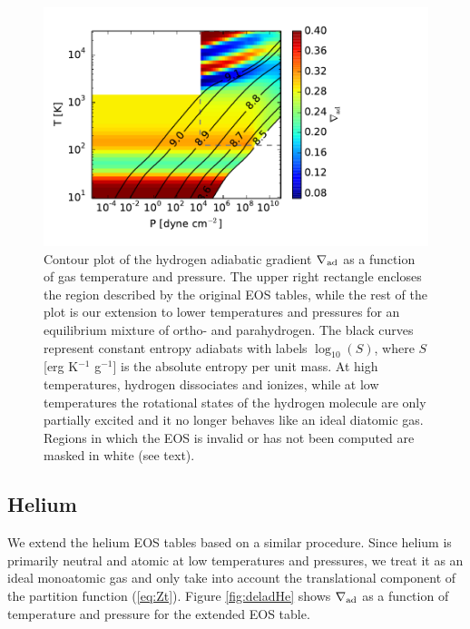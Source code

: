 \begin{figure}[h!]
\centering
\includegraphics[scale=.8]{figures/delad_S_H.pdf}
\caption{Contour plot of the hydrogen adiabatic gradient $\nabla_{\rm ad}$ as a function of gas temperature and pressure. The upper right rectangle encloses the region described by the original \citet{saumon95} EOS tables, while the rest of the plot is our extension to lower temperatures and pressures for an equilibrium mixture of ortho- and parahydrogen. The black curves represent constant entropy adiabats with labels $\log_{10}(S)$, where $S$ [erg K$^{-1}$ g$^{-1}$] is the absolute entropy per unit mass.  At high temperatures, hydrogen dissociates and ionizes, while at low temperatures the rotational states of the hydrogen molecule are only partially excited and it no longer behaves like an ideal diatomic gas. Regions in which the EOS is invalid or has not been computed are masked in white (see text).}
\label{fig:deladH}
\end{figure}

\subsection{Helium}

We extend the helium EOS tables based on a similar procedure. Since helium is primarily neutral and atomic at low temperatures and pressures, we treat it as an ideal monoatomic gas and  only take into account the translational component of the partition function (\ref{eq:Zt}). Figure \ref{fig:deladHe} shows $\nabla_{\rm ad}$ as a function of temperature and pressure for the extended EOS table. %

